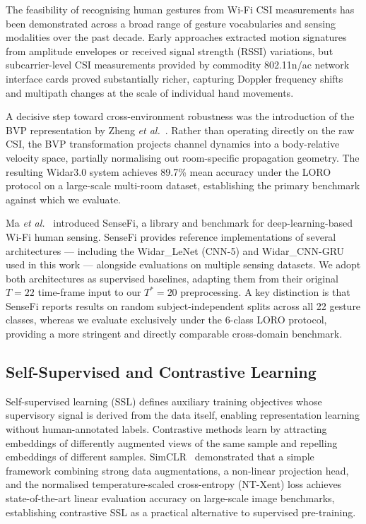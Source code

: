 \documentclass[journal]{IEEEtran}
\begin{document}
The feasibility of recognising human gestures from Wi-Fi CSI
measurements has been demonstrated across a broad range of gesture
vocabularies and sensing modalities over the past decade.
Early approaches extracted motion signatures from amplitude envelopes
or received signal strength (RSSI) variations, but subcarrier-level
CSI measurements provided by commodity 802.11n/ac network interface
cards proved substantially richer, capturing Doppler frequency shifts
and multipath changes at the scale of individual hand movements.

A decisive step toward cross-environment robustness was the
introduction of the BVP representation by Zheng
\textit{et al.}~\cite{zheng2019widar3}.
Rather than operating directly on the raw CSI, the BVP transformation
projects channel dynamics into a body-relative velocity space,
partially normalising out room-specific propagation geometry.
The resulting Widar3.0 system achieves 89.7\% mean accuracy under
the LORO protocol on a large-scale multi-room dataset, establishing
the primary benchmark against which we evaluate.

Ma \textit{et al.}~\cite{ma2023sensefi} introduced SenseFi, a
library and benchmark for deep-learning-based Wi-Fi human sensing.
SenseFi provides reference implementations of several architectures ---
including the Widar\_LeNet (CNN-5) and Widar\_CNN-GRU used in this
work --- alongside evaluations on multiple sensing datasets.
We adopt both architectures as supervised baselines, adapting them
from their original $T{=}22$ time-frame input to our $T^{*}{=}20$
preprocessing.
A key distinction is that SenseFi reports results on random
subject-independent splits across all 22 gesture classes, whereas
we evaluate exclusively under the 6-class LORO protocol,
providing a more stringent and directly comparable cross-domain
benchmark.

\subsection{Self-Supervised and Contrastive Learning}
\label{sec:related:ssl}

Self-supervised learning (SSL) defines auxiliary training objectives
whose supervisory signal is derived from the data itself, enabling
representation learning without human-annotated labels.
Contrastive methods learn by attracting embeddings of differently
augmented views of the same sample and repelling embeddings of
different samples.
SimCLR~\cite{chen2020simclr} demonstrated that a simple framework
combining strong data augmentations, a non-linear projection head,
and the normalised temperature-scaled cross-entropy (NT-Xent) loss
achieves state-of-the-art linear evaluation accuracy on large-scale
image benchmarks, establishing contrastive SSL as a practical
alternative to supervised pre-training.
\end{document}
